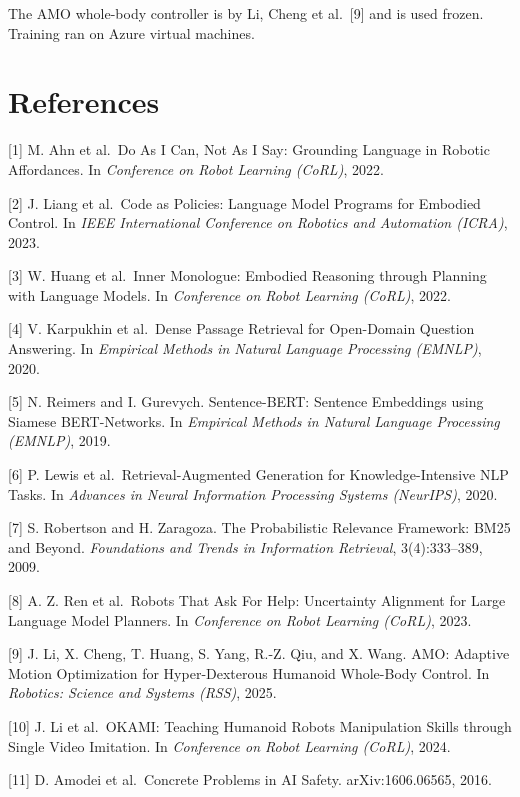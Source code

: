 \documentclass[
  10pt,
  twocolumn]{article}
\begin{document}
The AMO whole-body controller is by Li, Cheng et al.~{[}9{]} and is used
frozen. Training ran on Azure virtual machines.

\section*{References}\label{references}

{[}1{]} M. Ahn et al.~Do As I Can, Not As I Say: Grounding Language in
Robotic Affordances. In \emph{Conference on Robot Learning (CoRL)},
2022.

{[}2{]} J. Liang et al.~Code as Policies: Language Model Programs for
Embodied Control. In \emph{IEEE International Conference on Robotics and
Automation (ICRA)}, 2023.

{[}3{]} W. Huang et al.~Inner Monologue: Embodied Reasoning through
Planning with Language Models. In \emph{Conference on Robot Learning
(CoRL)}, 2022.

{[}4{]} V. Karpukhin et al.~Dense Passage Retrieval for Open-Domain
Question Answering. In \emph{Empirical Methods in Natural Language
Processing (EMNLP)}, 2020.

{[}5{]} N. Reimers and I. Gurevych. Sentence-BERT: Sentence Embeddings
using Siamese BERT-Networks. In \emph{Empirical Methods in Natural
Language Processing (EMNLP)}, 2019.

{[}6{]} P. Lewis et al.~Retrieval-Augmented Generation for
Knowledge-Intensive NLP Tasks. In \emph{Advances in Neural Information
Processing Systems (NeurIPS)}, 2020.

{[}7{]} S. Robertson and H. Zaragoza. The Probabilistic Relevance
Framework: BM25 and Beyond. \emph{Foundations and Trends in Information
Retrieval}, 3(4):333--389, 2009.

{[}8{]} A. Z. Ren et al.~Robots That Ask For Help: Uncertainty Alignment
for Large Language Model Planners. In \emph{Conference on Robot Learning
(CoRL)}, 2023.

{[}9{]} J. Li, X. Cheng, T. Huang, S. Yang, R.-Z. Qiu, and X. Wang. AMO:
Adaptive Motion Optimization for Hyper-Dexterous Humanoid Whole-Body
Control. In \emph{Robotics: Science and Systems (RSS)}, 2025.

{[}10{]} J. Li et al.~OKAMI: Teaching Humanoid Robots Manipulation
Skills through Single Video Imitation. In \emph{Conference on Robot
Learning (CoRL)}, 2024.

{[}11{]} D. Amodei et al.~Concrete Problems in AI Safety.
arXiv:1606.06565, 2016.
\end{document}

